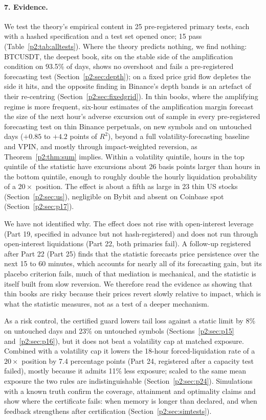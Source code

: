 \paragraph{7. Evidence.} We test the theory's empirical content in 25 pre-registered primary tests, each with a hashed specification and a test set opened once; 15 pass (Table~\ref{p2:tab:alltests}). Where the theory predicts nothing, we find nothing: BTCUSDT, the deepest book, sits on the stable side of the amplification condition on 93.5\% of days, shows no overshoot and fails a pre-registered forecasting test (Section~\ref{p2:sec:depth}); on a fixed price grid flow depletes the side it hits, and the opposite finding in Binance's depth bands is an artefact of their re-centring (Section~\ref{p2:sec:fixedgrid}). In thin books, where the amplifying regime is more frequent, six-hour estimates of the amplification margin forecast the size of the next hour's adverse excursion out of sample in every pre-registered forecasting test on thin Binance perpetuals, on new symbols and on untouched days ($+0.85$ to $+4.2$ points of $R^2$), beyond a full volatility-forecasting baseline and VPIN, and mostly through impact-weighted reversion, as Theorem~\ref{p2:thm:sum} implies. Within a volatility quintile, hours in the top quintile of the statistic have excursions about 26 basis points larger than hours in the bottom quintile, enough to roughly double the hourly liquidation probability of a $20\times$ position. The effect is about a fifth as large in 23 thin US stocks (Section~\ref{p2:sec:us}), negligible on Bybit and absent on Coinbase spot (Section~\ref{p2:sec:p17}).

We have not identified why. The effect does not rise with open-interest leverage (Part 19, specified in advance but not hash-registered) and does not run through open-interest liquidations (Part 22, both primaries fail). A follow-up registered after Part 22 (Part 25) finds that the statistic forecasts price persistence over the next 15 to 60 minutes, which accounts for nearly all of its forecasting gain, but its placebo criterion fails, much of that mediation is mechanical, and the statistic is itself built from slow reversion. We therefore read the evidence as showing that thin books are risky because their prices revert slowly relative to impact, which is what the statistic measures, not as a test of a deeper mechanism.

As a risk control, the certified guard lowers tail loss against a static limit by 8\% on untouched days and 23\% on untouched symbols (Sections~\ref{p2:sec:p15} and~\ref{p2:sec:p16}), but it does not beat a volatility cap at matched exposure. Combined with a volatility cap it lowers the 18-hour forced-liquidation rate of a $20\times$ position by 7.4 percentage points (Part 24, registered after a capacity test failed), mostly because it admits 11\% less exposure; scaled to the same mean exposure the two rules are indistinguishable (Section~\ref{p2:sec:p24}). Simulations with a known truth confirm the coverage, attainment and optimality claims and show where the certificate fails: when memory is longer than declared, and when feedback strengthens after certification (Section~\ref{p2:sec:simtests}).

